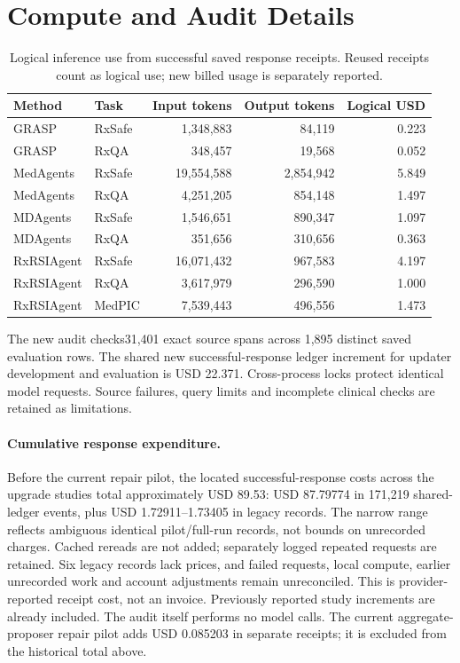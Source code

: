 \section{Compute and Audit Details}
\begin{table}[t]\centering\small
\setlength{\tabcolsep}{4pt}
\caption{Logical inference use from successful saved response receipts. Reused receipts count as logical use; new billed usage is separately reported.}
\label{tab:compute}
\begin{tabular}{@{}llrrr@{}}\toprule
Method & Task & Input tokens & Output tokens & Logical USD\\\midrule
GRASP & RxSafe & 1,348,883 & 84,119 & 0.223\\
GRASP & RxQA & 348,457 & 19,568 & 0.052\\
MedAgents & RxSafe & 19,554,588 & 2,854,942 & 5.849\\
MedAgents & RxQA & 4,251,205 & 854,148 & 1.497\\
MDAgents & RxSafe & 1,546,651 & 890,347 & 1.097\\
MDAgents & RxQA & 351,656 & 310,656 & 0.363\\
RxRSIAgent & RxSafe & 16,071,432 & 967,583 & 4.197\\
RxRSIAgent & RxQA & 3,617,979 & 296,590 & 1.000\\
RxRSIAgent & MedPIC & 7,539,443 & 496,556 & 1.473\\
\bottomrule\end{tabular}
\end{table}
The new audit checks31,401 exact source spans across 1,895 distinct saved evaluation rows. The shared new successful-response ledger increment for updater development and evaluation is USD 22.371. Cross-process locks protect identical model requests. Source failures, query limits and incomplete clinical checks are retained as limitations.
\paragraph{Cumulative response expenditure.}
Before the current repair pilot, the located successful-response costs across the upgrade studies total approximately USD 89.53: USD 87.79774 in 171,219 shared-ledger events, plus USD 1.72911--1.73405 in legacy records. The narrow range reflects ambiguous identical pilot/full-run records, not bounds on unrecorded charges. Cached rereads are not added; separately logged repeated requests are retained. Six legacy records lack prices, and failed requests, local compute, earlier unrecorded work and account adjustments remain unreconciled. This is provider-reported receipt cost, not an invoice. Previously reported study increments are already included. The audit itself performs no model calls.
 The current aggregate-proposer repair pilot adds USD 0.085203 in separate receipts; it is excluded from the historical total above.

